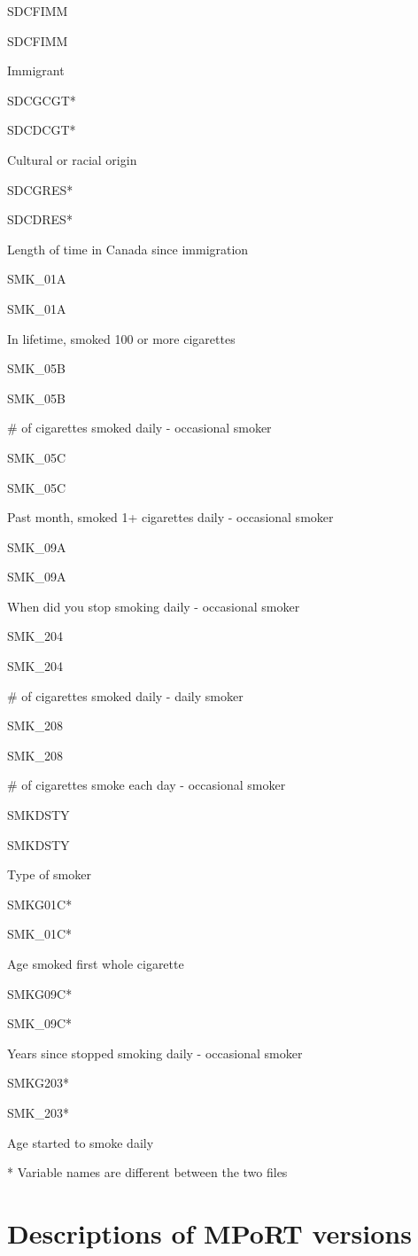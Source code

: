\documentclass[]{book}
\begin{document}
SDCFIMM

SDCFIMM

Immigrant

SDCGCGT*

SDCDCGT*

Cultural or racial origin

SDCGRES*

SDCDRES*

Length of time in Canada since immigration

SMK\_01A

SMK\_01A

In lifetime, smoked 100 or more cigarettes

SMK\_05B

SMK\_05B

\# of cigarettes smoked daily - occasional smoker

SMK\_05C

SMK\_05C

Past month, smoked 1+ cigarettes daily - occasional smoker

SMK\_09A

SMK\_09A

When did you stop smoking daily - occasional smoker

SMK\_204

SMK\_204

\# of cigarettes smoked daily - daily smoker

SMK\_208

SMK\_208

\# of cigarettes smoke each day - occasional smoker

SMKDSTY

SMKDSTY

Type of smoker

SMKG01C*

SMK\_01C*

Age smoked first whole cigarette

SMKG09C*

SMK\_09C*

Years since stopped smoking daily - occasional smoker

SMKG203*

SMK\_203*

Age started to smoke daily

* Variable names are different between the two files

\hypertarget{descriptions-of-mport-versions}{%
\section{Descriptions of MPoRT versions}\label{descriptions-of-mport-versions}}
\end{document}
